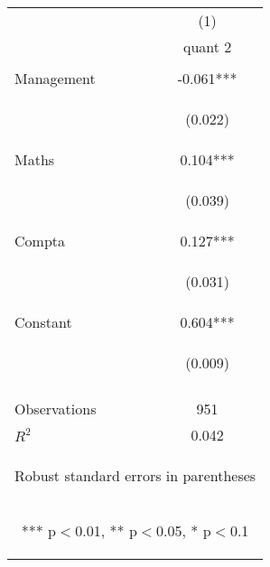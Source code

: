 \documentclass{article} %
\begin{document}
\begin{table}[H]

\begin{center}
\begin{tabular}{lc} \hline
 & (1) \\
 & quant 2 \\ \hline
\vspace{4pt} & \begin{footnotesize}\end{footnotesize} \\
Management & -0.061*** \\
\vspace{4pt} & \begin{footnotesize}(0.022)\end{footnotesize} \\
Maths & 0.104*** \\
\vspace{4pt} & \begin{footnotesize}(0.039)\end{footnotesize} \\
Compta & 0.127*** \\
\vspace{4pt} & \begin{footnotesize}(0.031)\end{footnotesize} \\
Constant & 0.604*** \\
 & \begin{footnotesize}(0.009)\end{footnotesize} \\
\vspace{4pt} & \begin{footnotesize}\end{footnotesize} \\
Observations & 951 \\
 $R^2$ & 0.042 \\ \hline
\multicolumn{2}{c}{\begin{footnotesize} Robust standard errors in parentheses\end{footnotesize}} \\
\multicolumn{2}{c}{\begin{footnotesize} *** p$<$0.01, ** p$<$0.05, * p$<$0.1\end{footnotesize}} \\
\end{tabular}
\end{center}

\end{table}
\end{document}
